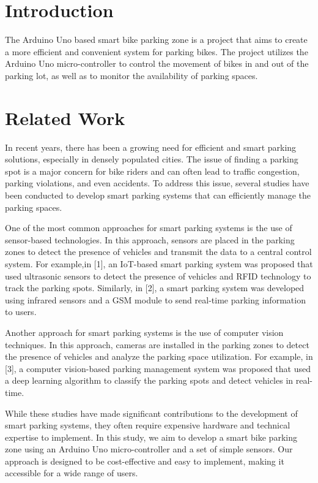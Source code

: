 \documentclass[conference]{IEEEtran}
\begin{document}
	\section{Introduction}
	The Arduino Uno based smart bike parking zone is a project that aims to create a more efficient and convenient system for parking bikes. The project utilizes the Arduino Uno micro-controller to control the movement of bikes in and out of the parking lot, as well as to monitor the availability of parking spaces. 
	
	\section{Related Work}
	In recent years, there has been a growing need for efficient and smart parking solutions, especially in densely populated cities. The issue of finding a parking spot is a major concern for bike riders and can often lead to traffic congestion, parking violations, and even accidents. To address this issue, several studies have been conducted to develop smart parking systems that can efficiently manage the parking spaces.
	
	One of the most common approaches for smart parking systems is the use of sensor-based technologies. In this approach, sensors are placed in the parking zones to detect the presence of vehicles and transmit the data to a central control system. For example,in [1], an IoT-based smart parking system was proposed that used ultrasonic sensors to detect the presence of vehicles and RFID technology to track the parking spots. Similarly, in [2], a smart parking system was developed using infrared sensors and a GSM module to send real-time parking information to users.
	
	Another approach for smart parking systems is the use of computer vision techniques. In this approach, cameras are installed in the parking zones to detect the presence of vehicles and analyze the parking space utilization. For example, in [3], a computer vision-based parking management system was proposed that used a deep learning algorithm to classify the parking spots and detect vehicles in real-time.
	
	While these studies have made significant contributions to the development of smart parking systems, they often require expensive hardware and technical expertise to implement. In this study, we aim to develop a smart bike parking zone using an Arduino Uno micro-controller and a set of simple sensors. Our approach is designed to be cost-effective and easy to implement, making it accessible for a wide range of users.
	
\end{document}
